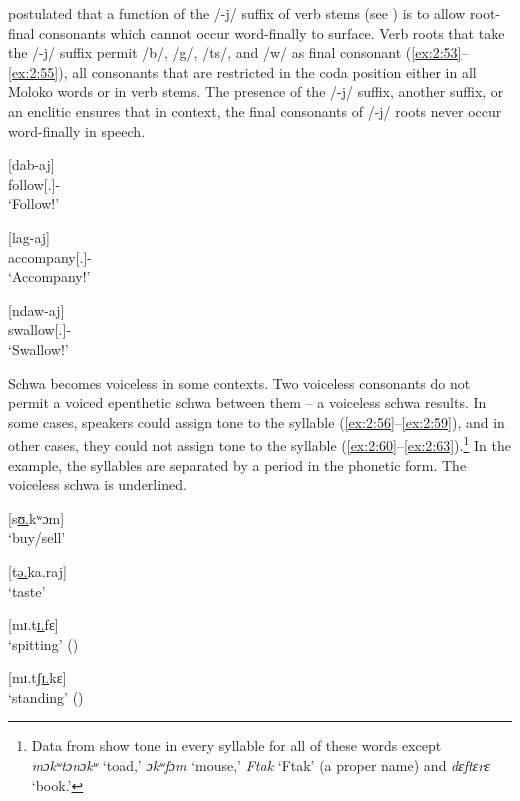 \citet{FriesenMamalis2008} postulated that a function of the /-j/ suffix of verb stems (see ) is to allow root-final consonants which cannot occur word-finally to surface. Verb roots that take the /-j/ suffix permit /b/, /g/, /ts/, and /w/ as final consonant (\ref{ex:2:53}--\ref{ex:2:55}), all consonants that are restricted in the coda position either in all Moloko words or in verb stems. The presence of the /-j/ suffix, another suffix, or an enclitic ensures that in context, the final consonants of /-j/ roots never occur word-finally in speech.  

\ea \label{ex:2:53}
\textup{[dab-aj]}\\
      follow[{\twoS}.{\IMP}]{}-{\CL}\\
\glt  ‘Follow!’
\z

\ea \label{ex:2:54}
\textup{[lag-aj]}\\
      accompany[{\twoS}.{\IMP}]{}-{\CL}\\
\glt  ‘Accompany!’
\z

\ea \label{ex:2:55}
\textup{[ndaw-aj]}\\
      swallow[{\twoS}.{\IMP}]{}-{\CL}\\
\glt  ‘Swallow!’
\z

Schwa becomes voiceless in some contexts. Two voiceless consonants do not permit a voiced epenthetic schwa between them -- a voiceless schwa results. In some cases, speakers could assign tone to the syllable (\ref{ex:2:56}--\ref{ex:2:59}), and in other cases, they could not assign tone to the syllable (\ref{ex:2:60}--\ref{ex:2:63}).\footnote{Data from \citet{Bow1997c} show tone in every syllable for all of these words except \textit{mɔkʷtɔnɔkʷ} ‘toad,’ \textit{ɔkʷfɔm} ‘mouse,’ \textit{Ftak} ‘Ftak’ (a proper name) and \textit{dɛftɛrɛ} ‘book.’} In the example, the syllables are separated by a period in the phonetic form. The voiceless schwa is underlined. 

\ea \label{ex:2:56}
\textup{[}s\underline{\textup{ʊ.}}\textup{kʷɔm}\textup{]}\\
\glt  ‘buy/sell’
\z

\ea \label{ex:2:57}
\textup{[}t\underline{\textup{ə.}}\textup{ka.raj}\textup{]}\\
\glt  ‘taste’
\z

\ea \label{ex:2:58}
\textup{[mɪ.t}\underline{\textup{ɪ.}}\textup{fɛ}\textup{]}\\
\glt  ‘spitting’ ({\NOM})
\z

\ea \label{ex:2:59}
\textup{[mɪ.tʃ}\underline{\textup{ɪ.}}\textup{kɛ}\textup{]}\\
\glt  ‘standing’ ({\NOM})
\z

